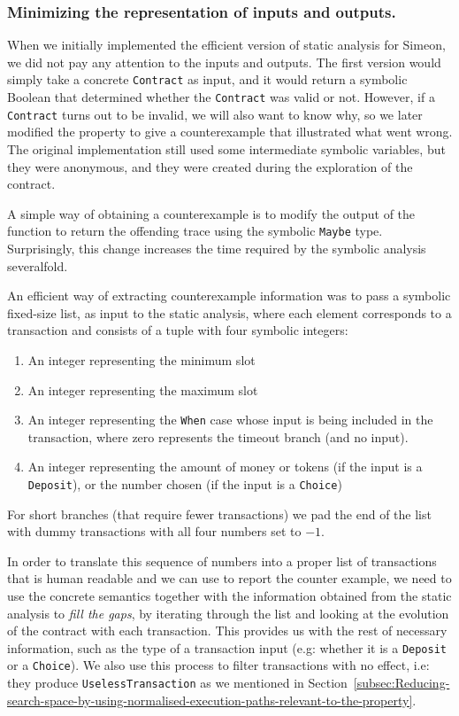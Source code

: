 \documentclass[english,runningheads]{llncs}
\begin{document}
\subsubsection{Minimizing the representation of inputs and outputs.}

When we initially implemented the efficient version of static analysis
for Simeon, we did not pay any attention to the inputs and outputs.
The first version would simply take a concrete \texttt{Contract}
as input, and it would return a symbolic Boolean that determined whether
the \texttt{Contract} was valid or not. However, if a \texttt{Contract}
turns out to be invalid, we will also want to know why, so we later modified
the property to give a counterexample that illustrated what went wrong.
The original implementation still used some intermediate symbolic
variables, but they were anonymous, and they were created during the
exploration of the contract.

A simple way of obtaining a counterexample is to modify the output
of the function to return the offending trace using the symbolic \texttt{Maybe}
type. Surprisingly, this change increases the time
required by the symbolic analysis severalfold.

An efficient way of extracting counterexample information was to
pass a symbolic fixed-size list, as input to the static analysis, where
each element corresponds to a transaction and consists of a tuple with four symbolic integers:
\begin{enumerate}
\item An integer representing the minimum slot
\item An integer representing the maximum slot
\item An integer representing the \texttt{When} case whose input is being
included in the transaction, where zero represents the timeout branch (and no input).
\item An integer representing the amount of money or tokens (if the input
is a \texttt{Deposit}), or the number chosen (if the input is a \texttt{Choice})
\end{enumerate}
For short branches (that require fewer transactions) we pad the end of
the list with dummy transactions with all four numbers set to $-1$.

In order to translate this sequence of numbers into a proper list
of transactions that is human readable and we can use to report the
counter example, we need to use the concrete semantics together with
the information obtained from the static analysis to \emph{fill the gaps},
by iterating through the list and looking at the evolution
of the contract with each transaction.
This provides us with the rest of necessary information, such as
the type of a transaction input (e.g: whether it is a \texttt{Deposit} or a \texttt{Choice}). We also use this process to filter transactions with no effect,
i.e: they produce \texttt{UselessTransaction} as we mentioned in Section~\ref{subsec:Reducing-search-space-by-using-normalised-execution-paths-relevant-to-the-property}.
\end{document}
